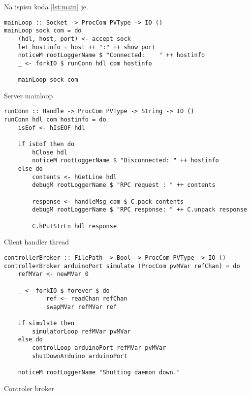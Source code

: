 Na ispisu koda \ref{lst:main} je.

\begin{listing}[H]
\centering
\begin{verbatim}
mainLoop :: Socket -> ProcCom PVType -> IO ()
mainLoop sock com = do
    (hdl, host, port) <- accept sock
    let hostinfo = host ++ ":" ++ show port
    noticeM rootLoggerName $ "Connected:    " ++ hostinfo
    _ <- forkIO $ runConn hdl com hostinfo

    mainLoop sock com
\end{verbatim}
\caption{Server mainloop}
\label{lst:mainloop}
\end{listing}

\begin{listing}[H]
\centering
\begin{verbatim}
runConn :: Handle -> ProcCom PVType -> String -> IO ()
runConn hdl com hostinfo = do
    isEof <- hIsEOF hdl

    if isEof then do
        hClose hdl
        noticeM rootLoggerName $ "Disconnected: " ++ hostinfo
    else do
        contents <- hGetLine hdl
        debugM rootLoggerName $ "RPC request : " ++ contents

        response <- handleMsg com $ C.pack contents
        debugM rootLoggerName $ "RPC response: " ++ C.unpack response

        C.hPutStrLn hdl response
\end{verbatim}
\caption{Client handler thread}
\label{lst:client handler}
\end{listing}

\begin{listing}[H]
\centering
\begin{verbatim}
controllerBroker :: FilePath -> Bool -> ProcCom PVType -> IO ()
controllerBroker arduinoPort simulate (ProcCom pvMVar refChan) = do
    refMVar <- newMVar 0

    _ <- forkIO $ forever $ do
            ref <- readChan refChan
            swapMVar refMVar ref

    if simulate then
        simulatorLoop refMVar pvMVar
    else do
        controlLoop arduinoPort refMVar pvMVar
        shutDownArduino arduinoPort

    noticeM rootLoggerName "Shutting daemon down."
\end{verbatim}
\caption{Controler broker}
\label{lst:controler broker}
\end{listing}

